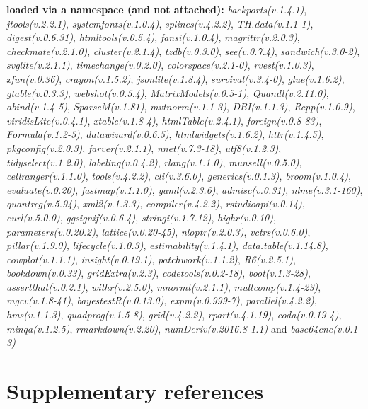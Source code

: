 \documentclass[
  bookmarksnumbered]{article}
\begin{document}
\textbf{loaded via a namespace (and not attached):}
\emph{backports(v.1.4.1)}, \emph{jtools(v.2.2.1)}, \emph{systemfonts(v.1.0.4)}, \emph{splines(v.4.2.2)}, \emph{TH.data(v.1.1-1)}, \emph{digest(v.0.6.31)}, \emph{htmltools(v.0.5.4)}, \emph{fansi(v.1.0.4)}, \emph{magrittr(v.2.0.3)}, \emph{checkmate(v.2.1.0)}, \emph{cluster(v.2.1.4)}, \emph{tzdb(v.0.3.0)}, \emph{see(v.0.7.4)}, \emph{sandwich(v.3.0-2)}, \emph{svglite(v.2.1.1)}, \emph{timechange(v.0.2.0)}, \emph{colorspace(v.2.1-0)}, \emph{rvest(v.1.0.3)}, \emph{xfun(v.0.36)}, \emph{crayon(v.1.5.2)}, \emph{jsonlite(v.1.8.4)}, \emph{survival(v.3.4-0)}, \emph{glue(v.1.6.2)}, \emph{gtable(v.0.3.3)}, \emph{webshot(v.0.5.4)}, \emph{MatrixModels(v.0.5-1)}, \emph{Quandl(v.2.11.0)}, \emph{abind(v.1.4-5)}, \emph{SparseM(v.1.81)}, \emph{mvtnorm(v.1.1-3)}, \emph{DBI(v.1.1.3)}, \emph{Rcpp(v.1.0.9)}, \emph{viridisLite(v.0.4.1)}, \emph{xtable(v.1.8-4)}, \emph{htmlTable(v.2.4.1)}, \emph{foreign(v.0.8-83)}, \emph{Formula(v.1.2-5)}, \emph{datawizard(v.0.6.5)}, \emph{htmlwidgets(v.1.6.2)}, \emph{httr(v.1.4.5)}, \emph{pkgconfig(v.2.0.3)}, \emph{farver(v.2.1.1)}, \emph{nnet(v.7.3-18)}, \emph{utf8(v.1.2.3)}, \emph{tidyselect(v.1.2.0)}, \emph{labeling(v.0.4.2)}, \emph{rlang(v.1.1.0)}, \emph{munsell(v.0.5.0)}, \emph{cellranger(v.1.1.0)}, \emph{tools(v.4.2.2)}, \emph{cli(v.3.6.0)}, \emph{generics(v.0.1.3)}, \emph{broom(v.1.0.4)}, \emph{evaluate(v.0.20)}, \emph{fastmap(v.1.1.0)}, \emph{yaml(v.2.3.6)}, \emph{admisc(v.0.31)}, \emph{nlme(v.3.1-160)}, \emph{quantreg(v.5.94)}, \emph{xml2(v.1.3.3)}, \emph{compiler(v.4.2.2)}, \emph{rstudioapi(v.0.14)}, \emph{curl(v.5.0.0)}, \emph{ggsignif(v.0.6.4)}, \emph{stringi(v.1.7.12)}, \emph{highr(v.0.10)}, \emph{parameters(v.0.20.2)}, \emph{lattice(v.0.20-45)}, \emph{nloptr(v.2.0.3)}, \emph{vctrs(v.0.6.0)}, \emph{pillar(v.1.9.0)}, \emph{lifecycle(v.1.0.3)}, \emph{estimability(v.1.4.1)}, \emph{data.table(v.1.14.8)}, \emph{cowplot(v.1.1.1)}, \emph{insight(v.0.19.1)}, \emph{patchwork(v.1.1.2)}, \emph{R6(v.2.5.1)}, \emph{bookdown(v.0.33)}, \emph{gridExtra(v.2.3)}, \emph{codetools(v.0.2-18)}, \emph{boot(v.1.3-28)}, \emph{assertthat(v.0.2.1)}, \emph{withr(v.2.5.0)}, \emph{mnormt(v.2.1.1)}, \emph{multcomp(v.1.4-23)}, \emph{mgcv(v.1.8-41)}, \emph{bayestestR(v.0.13.0)}, \emph{expm(v.0.999-7)}, \emph{parallel(v.4.2.2)}, \emph{hms(v.1.1.3)}, \emph{quadprog(v.1.5-8)}, \emph{grid(v.4.2.2)}, \emph{rpart(v.4.1.19)}, \emph{coda(v.0.19-4)}, \emph{minqa(v.1.2.5)}, \emph{rmarkdown(v.2.20)}, \emph{numDeriv(v.2016.8-1.1)} and \emph{base64enc(v.0.1-3)}

\hypertarget{refs}{%
\section*{Supplementary references}\label{refs}}
\end{document}
